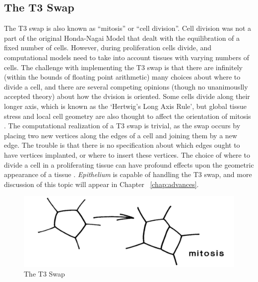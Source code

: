 \subsection{The T3 Swap}
The T3 swap is also known as ``mitosis'' or ``cell division''. Cell division was not a part of the original Honda-Nagai Model \cite{HondaNagai} that dealt with the equilibration of a fixed number of cells. However, during proliferation cells divide, and computational models need to take into account tissues with varying numbers of cells. The challenge with implementing the T3 swap is that there are infinitely (within the bounds of floating point arithmetic) many choices about where to divide a cell, and there are several competing opinions (though no unanimouslly accepted theory) about how the dvision is oriented. Some cells divide along their longer axis, which is known as the `Hertwig's Long Axis Rule', but global tissue stress and local cell geometry are also thought to affect the orientation of mitosis \cite{Order}\cite{Orientation}. The computational realization of a T3 swap is trivial, as the swap occurs by placing two new vertices along the edges of a cell and joining them by a new edge. The trouble is that there is no specification about which edges ought to have vertices implanted, or where to insert these vertices. The choice of where to divide a cell in a proliferating tissue can have profound effects upon the geometric appearance of a tissue \cite{EpithelialTopology}. \emph{Epithelium} is capable of handling the T3 swap, and more discussion of this topic will appear in Chapter ~\ref{chap:advances}.
\begin{figure}
\centering
\includegraphics[width=\textwidth]{../diagrams/t3.png}
\caption{The T3 Swap}
\label{fig:t3}
\end{figure}
